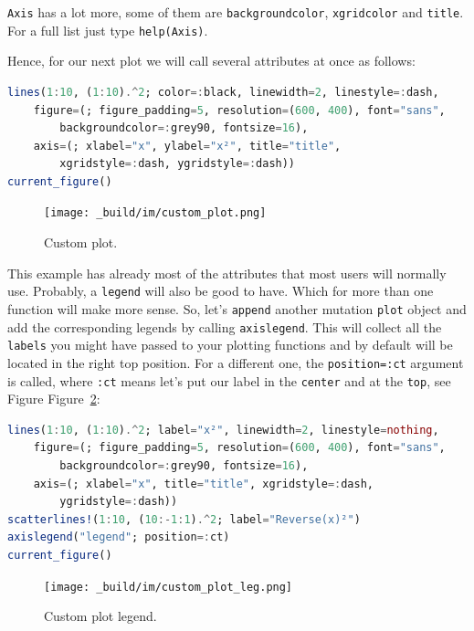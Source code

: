 \documentclass[
  notoc %
]{tufte-book}
\newcommand{\passthrough}[1]{#1}
\begin{document}
\passthrough{\lstinline!Axis!} has a lot more, some of them are
\passthrough{\lstinline!backgroundcolor!},
\passthrough{\lstinline!xgridcolor!} and
\passthrough{\lstinline!title!}. For a full list just type
\passthrough{\lstinline!help(Axis)!}.

Hence, for our next plot we will call several attributes at once as
follows:

\begin{lstlisting}[language=Julia]
lines(1:10, (1:10).^2; color=:black, linewidth=2, linestyle=:dash,
    figure=(; figure_padding=5, resolution=(600, 400), font="sans",
        backgroundcolor=:grey90, fontsize=16),
    axis=(; xlabel="x", ylabel="x²", title="title",
        xgridstyle=:dash, ygridstyle=:dash))
current_figure()
\end{lstlisting}

\begin{figure}
\hypertarget{fig:custom_plot}{%
\centering
\texttt{[image: \_build/im/custom\_plot.png]}
\caption{Custom plot.}\label{fig:custom_plot}
}
\end{figure}

This example has already most of the attributes that most users will
normally use. Probably, a \passthrough{\lstinline!legend!} will also be
good to have. Which for more than one function will make more sense. So,
let's \passthrough{\lstinline!append!} another mutation
\passthrough{\lstinline!plot!} object and add the corresponding legends
by calling \passthrough{\lstinline!axislegend!}. This will collect all
the \passthrough{\lstinline!labels!} you might have passed to your
plotting functions and by default will be located in the right top
position. For a different one, the
\passthrough{\lstinline!position=:ct!} argument is called, where
\passthrough{\lstinline!:ct!} means let's put our label in the
\passthrough{\lstinline!center!} and at the
\passthrough{\lstinline!top!}, see Figure
Figure~\ref{fig:custom_plot_leg}:

\begin{lstlisting}[language=Julia]
lines(1:10, (1:10).^2; label="x²", linewidth=2, linestyle=nothing,
    figure=(; figure_padding=5, resolution=(600, 400), font="sans",
        backgroundcolor=:grey90, fontsize=16),
    axis=(; xlabel="x", title="title", xgridstyle=:dash,
        ygridstyle=:dash))
scatterlines!(1:10, (10:-1:1).^2; label="Reverse(x)²")
axislegend("legend"; position=:ct)
current_figure()
\end{lstlisting}

\begin{figure}
\hypertarget{fig:custom_plot_leg}{%
\centering
\texttt{[image: \_build/im/custom\_plot\_leg.png]}
\caption{Custom plot legend.}\label{fig:custom_plot_leg}
}
\end{figure}
\end{document}

